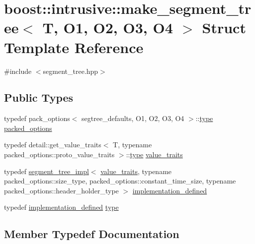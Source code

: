 \hypertarget{structboost_1_1intrusive_1_1make__segment__tree}{}\section{boost\+:\+:intrusive\+:\+:make\+\_\+segment\+\_\+tree$<$ T, O1, O2, O3, O4 $>$ Struct Template Reference}
\label{structboost_1_1intrusive_1_1make__segment__tree}


{\ttfamily \#include $<$segment\+\_\+tree.\+hpp$>$}

\subsection*{Public Types}
\begin{DoxyCompactItemize}
\item 
typedef pack\+\_\+options$<$ segtree\+\_\+defaults, O1, O2, O3, O4 $>$\+::\hyperlink{structboost_1_1intrusive_1_1make__segment__tree_ac52c74ebd4a40dc2d3f2a37145bfe469}{type} \hyperlink{structboost_1_1intrusive_1_1make__segment__tree_ab09dfb845c300bf467f406f8e7545903}{packed\+\_\+options}
\item 
typedef detail\+::get\+\_\+value\+\_\+traits$<$ T, typename packed\+\_\+options\+::proto\+\_\+value\+\_\+traits $>$\+::\hyperlink{structboost_1_1intrusive_1_1make__segment__tree_ac52c74ebd4a40dc2d3f2a37145bfe469}{type} \hyperlink{structboost_1_1intrusive_1_1make__segment__tree_a865aca881f5d22f89580dc0692503bff}{value\+\_\+traits}
\item 
typedef \hyperlink{classboost_1_1intrusive_1_1segment__tree__impl}{segment\+\_\+tree\+\_\+impl}$<$ \hyperlink{structboost_1_1intrusive_1_1make__segment__tree_a865aca881f5d22f89580dc0692503bff}{value\+\_\+traits}, typename packed\+\_\+options\+::size\+\_\+type, packed\+\_\+options\+::constant\+\_\+time\+\_\+size, typename packed\+\_\+options\+::header\+\_\+holder\+\_\+type $>$ \hyperlink{structboost_1_1intrusive_1_1make__segment__tree_a1a009d43964299a632641ecd7c2b0250}{implementation\+\_\+defined}
\item 
typedef \hyperlink{structboost_1_1intrusive_1_1make__segment__tree_a1a009d43964299a632641ecd7c2b0250}{implementation\+\_\+defined} \hyperlink{structboost_1_1intrusive_1_1make__segment__tree_ac52c74ebd4a40dc2d3f2a37145bfe469}{type}
\end{DoxyCompactItemize}


\subsection{Member Typedef Documentation}
\mbox{\label{structboost_1_1intrusive_1_1make__segment__tree_a1a009d43964299a632641ecd7c2b0250}} 
